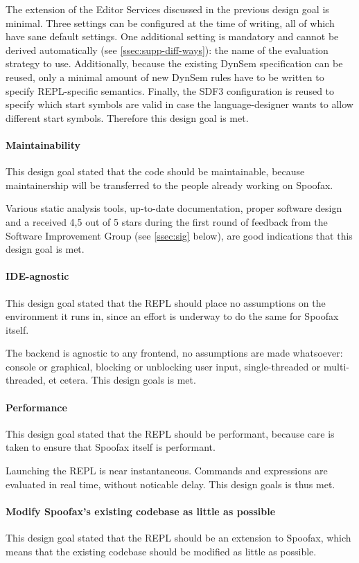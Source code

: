 The extension of the Editor Services discussed in the previous design goal is
minimal. Three settings can be configured at the time of writing, all of which
have sane default settings. One additional setting is mandatory and cannot be
derived automatically (see \cref{ssec:supp-diff-ways}): the name of the
evaluation strategy to use. Additionally, because the existing DynSem
specification can be reused, only a minimal amount of new DynSem rules have to
be written to specify REPL-specific semantics. Finally, the SDF3 configuration
is reused to specify which start symbols are valid in case the language-designer
wants to allow different start symbols. Therefore this design goal is met.

\paragraph{Maintainability} This design goal stated that the code should be
maintainable, because maintainership will be transferred to the people already
working on Spoofax.

Various static analysis tools, up-to-date documentation, proper software design
and a received 4,5 out of 5 stars during the first round of feedback from the
Software Improvement Group (see \cref{ssec:sig} below), are good indications that
this design goal is met.

\paragraph{IDE-agnostic} This design goal stated that the REPL should place no
assumptions on the environment it runs in, since an effort is underway to do the
same for Spoofax itself.

The backend is agnostic to any frontend, no assumptions are made whatsoever:
console or graphical, blocking or unblocking user input, single-threaded or
multi-threaded, et cetera. This design goals is met.

\paragraph{Performance} This design goal stated that the REPL should be
performant, because care is taken to ensure that Spoofax itself is performant.

Launching the REPL is near instantaneous. Commands and expressions are evaluated
in real time, without noticable delay. This design goals is thus met.

\paragraph{Modify Spoofax's existing codebase as little as possible} This design
goal stated that the REPL should be an extension to Spoofax, which means that
the existing codebase should be modified as little as possible.


